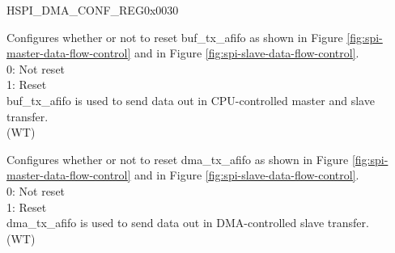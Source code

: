 \begin{register}{H}{SPI\_DMA\_CONF\_REG}{0x0030}
\begin{regdesc}
\begin{reglist}
\label{fielddesc:SPIBUFAFIFORST}\item [SPI\_BUF\_AFIFO\_RST] Configures whether or not to reset buf\_tx\_afifo as shown in Figure \ref{fig:spi-master-data-flow-control} and in Figure \ref{fig:spi-slave-data-flow-control}.\\
0: Not reset\\
1: Reset\\
buf\_tx\_afifo is used to send data out in CPU-controlled master and slave transfer. \\ (WT)
\label{fielddesc:SPIDMAAFIFORST}\item [SPI\_DMA\_AFIFO\_RST] Configures whether or not to reset dma\_tx\_afifo as shown in Figure \ref{fig:spi-master-data-flow-control} and in Figure \ref{fig:spi-slave-data-flow-control}.\\
0: Not reset\\
1: Reset\\
dma\_tx\_afifo is used to send data out in DMA-controlled slave transfer. \\ (WT)
\end{reglist}\end{regdesc}
\end{register}


